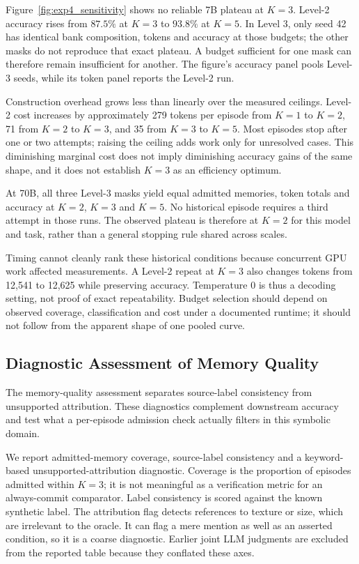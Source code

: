 \documentclass[onecolumn]{IEEEtran}
\numberwithin{equation}{section}
\theoremstyle{definition}
\theoremstyle{remark}
\begin{document}
Figure~\ref{fig:exp4_sensitivity} shows no reliable 7B plateau at $K=3$. Level-2 accuracy rises from $87.5\%$ at $K=3$ to $93.8\%$ at $K=5$. In Level 3, only seed 42 has identical bank composition, tokens and accuracy at those budgets; the other masks do not reproduce that exact plateau. A budget sufficient for one mask can therefore remain insufficient for another. The figure's accuracy panel pools Level-3 seeds, while its token panel reports the Level-2 run.

Construction overhead grows less than linearly over the measured ceilings. Level-2 cost increases by approximately 279 tokens per episode from $K=1$ to $K=2$, 71 from $K=2$ to $K=3$, and 35 from $K=3$ to $K=5$. Most episodes stop after one or two attempts; raising the ceiling adds work only for unresolved cases. This diminishing marginal cost does not imply diminishing accuracy gains of the same shape, and it does not establish $K=3$ as an efficiency optimum.

At 70B, all three Level-3 masks yield equal admitted memories, token totals and accuracy at $K=2$, $K=3$ and $K=5$. No historical episode requires a third attempt in those runs. The observed plateau is therefore at $K=2$ for this model and task, rather than a general stopping rule shared across scales.

Timing cannot cleanly rank these historical conditions because concurrent GPU work affected measurements. A Level-2 repeat at $K=3$ also changes tokens from 12,541 to 12,625 while preserving accuracy. Temperature $0$ is thus a decoding setting, not proof of exact repeatability. Budget selection should depend on observed coverage, classification and cost under a documented runtime; it should not follow from the apparent shape of one pooled curve.

\subsection{Diagnostic Assessment of Memory Quality}
\label{sec:exp5}

The memory-quality assessment separates source-label consistency from unsupported attribution. These diagnostics complement downstream accuracy and test what a per-episode admission check actually filters in this symbolic domain.

We report admitted-memory coverage, source-label consistency and a keyword-based unsupported-attribution diagnostic. Coverage is the proportion of episodes admitted within $K=3$; it is not meaningful as a verification metric for an always-commit comparator. Label consistency is scored against the known synthetic label. The attribution flag detects references to texture or size, which are irrelevant to the oracle. It can flag a mere mention as well as an asserted condition, so it is a coarse diagnostic. Earlier joint LLM judgments are excluded from the reported table because they conflated these axes.
\end{document}
